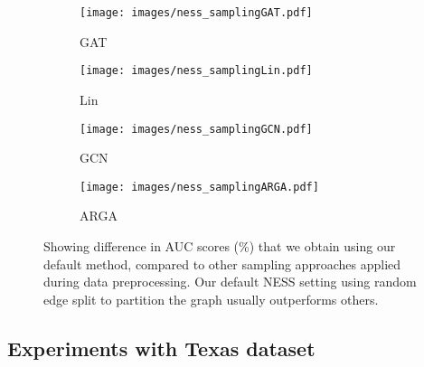 \documentclass{article}
\begin{document}
\begin{figure*}[ht]
\vskip 0.2in
\begin{center}
     \begin{subfigure}[c]{0.21\textwidth}
         \texttt{[image: images/ness\_samplingGAT.pdf]}
         \caption{GAT}
     \end{subfigure}
     \begin{subfigure}[c]{0.21\textwidth}
         \texttt{[image: images/ness\_samplingLin.pdf]}
         \caption{Lin}
     \end{subfigure}
     \begin{subfigure}[c]{0.21\textwidth}
         \texttt{[image: images/ness\_samplingGCN.pdf]}
         \caption{GCN}
     \end{subfigure}
     \begin{subfigure}[c]{0.3\textwidth}
         \texttt{[image: images/ness\_samplingARGA.pdf]}
         \caption{ARGA}
     \end{subfigure}
     
\caption{Showing difference in AUC scores (\%) that we obtain using our default method, compared to other sampling approaches applied during data preprocessing. Our default NESS setting using random edge split to partition the graph usually outperforms others.}\label{fig:appx_comparing_sampling_approaches}
\end{center}
\vskip -0.2in
\end{figure*}

\subsection{Experiments with Texas dataset}\label{aggregating_embeddings_texas}
\end{document}
